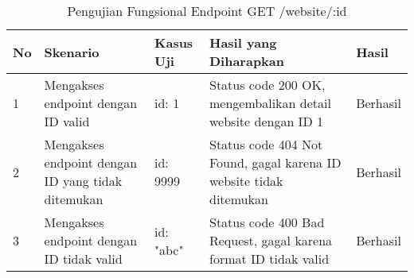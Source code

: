\begin{table}[H]
    \centering
    \begin{tabular}{|p{0.5cm}|p{3cm}|p{5cm}|p{5cm}|p{1.5cm}|}
        \hline
        \rowcolor[HTML]{DAE8FC} 
        \textbf{No} & \textbf{Skenario} & \textbf{Kasus Uji} & \textbf{Hasil yang Diharapkan} & \textbf{Hasil} \\ \hline
        1 & Mengakses endpoint dengan ID valid & 
        id: 1 & 
        Status code 200 OK, mengembalikan detail website dengan ID 1 & 
        Berhasil \\ \hline
        2 & Mengakses endpoint dengan ID yang tidak ditemukan & 
        id: 9999 & 
        Status code 404 Not Found, gagal karena ID website tidak ditemukan & 
        Berhasil \\ \hline
        3 & Mengakses endpoint dengan ID tidak valid & 
        id: "abc" & 
        Status code 400 Bad Request, gagal karena format ID tidak valid & 
        Berhasil \\ \hline
    \end{tabular}
    \caption{Pengujian Fungsional Endpoint GET /website/:id}
    \label{tab:website_getone_testing}
\end{table}
